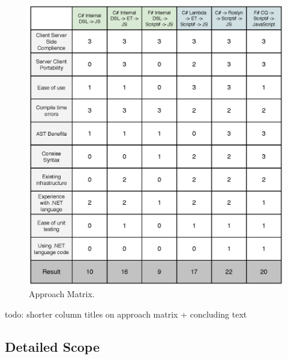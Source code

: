 						\begin{figure}[H]
			\begin{center}
				\centerline{\includegraphics[width=16cm]{resources/images/approachmatrix.eps}}
			\end{center}
			\caption{Approach Matrix.}
			\label{approachMatrix}
		\end{figure}


	todo: shorter column titles on approach matrix + concluding text

	\subsection{Detailed Scope} %
	\label{sub:detailed_scope}
	

